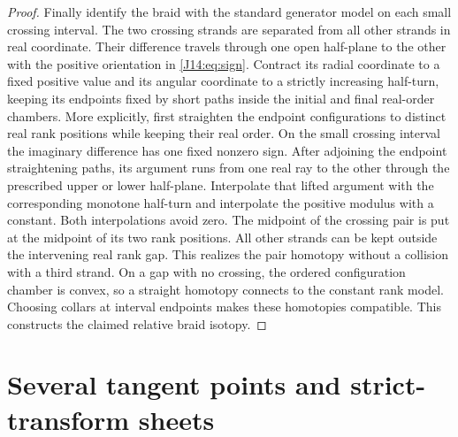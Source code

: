 \documentclass[11pt,oneside]{report}
\theoremstyle{definition}
\numberwithin{equation}{section}
\begin{document}
\begin{proof}
Finally identify the braid with the standard generator model on each small
crossing interval. The two crossing strands are separated from all other
strands in real coordinate. Their difference travels through one open
half-plane to the other with the positive orientation in
\eqref{J14:eq:sign}. Contract its radial coordinate to a fixed positive value
and its angular coordinate to a strictly increasing half-turn, keeping its
endpoints fixed by short paths inside the initial and final real-order
chambers. More explicitly, first straighten the endpoint configurations to
distinct real rank positions while keeping their real order. On the small
crossing interval the imaginary difference has one fixed nonzero sign.
After adjoining the endpoint straightening paths, its argument runs from
one real ray to the other through the prescribed upper or lower half-plane.
Interpolate that lifted argument with the corresponding monotone half-turn
and interpolate the positive modulus with a constant. Both interpolations
avoid zero. The midpoint of the crossing pair is put at the midpoint of its
two rank positions. All other strands can be kept outside the intervening
real rank gap. This realizes the pair homotopy without a collision with a
third strand. On a gap with no crossing, the ordered
configuration chamber is convex, so a straight homotopy connects to the
constant rank model. Choosing collars at interval endpoints makes these
homotopies compatible. This constructs the claimed relative braid isotopy.
\end{proof}

\section{Several tangent points and strict-transform sheets}
\end{document}

